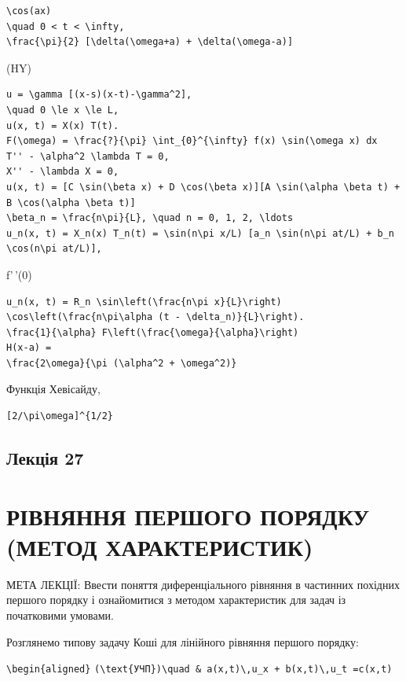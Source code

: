 \documentclass[
  ukrainian,
]{article}
\begin{document}
\begin{verbatim}
\cos(ax)
\quad 0 < t < \infty,
\frac{\pi}{2} [\delta(\omega+a) + \delta(\omega-a)]
\end{verbatim}

(HY)

\begin{verbatim}
u = \gamma [(x-s)(x-t)-\gamma^2],
\quad 0 \le x \le L,
u(x, t) = X(x) T(t).
F(\omega) = \frac{?}{\pi} \int_{0}^{\infty} f(x) \sin(\omega x) dx
T'' - \alpha^2 \lambda T = 0,
X'' - \lambda X = 0,
u(x, t) = [C \sin(\beta x) + D \cos(\beta x)][A \sin(\alpha \beta t) + B \cos(\alpha \beta t)]
\beta_n = \frac{n\pi}{L}, \quad n = 0, 1, 2, \ldots
u_n(x, t) = X_n(x) T_n(t) = \sin(n\pi x/L) [a_n \sin(n\pi at/L) + b_n \cos(n\pi at/L)],
\end{verbatim}

f'\,'(0)

\begin{verbatim}
u_n(x, t) = R_n \sin\left(\frac{n\pi x}{L}\right) \cos\left(\frac{n\pi\alpha (t - \delta_n)}{L}\right).
\frac{1}{\alpha} F\left(\frac{\omega}{\alpha}\right)
H(x-a) =
\frac{2\omega}{\pi (\alpha^2 + \omega^2)}
\end{verbatim}

Функція Хевісайду,

\begin{verbatim}
[2/\pi\omega]^{1/2}
\end{verbatim}

\subsection{Лекція 27}\label{ux43bux435ux43aux446ux456ux44f-27}

\section{РІВНЯННЯ ПЕРШОГО ПОРЯДКУ (МЕТОД
ХАРАКТЕРИСТИК)}\label{ux440ux456ux432ux43dux44fux43dux43dux44f-ux43fux435ux440ux448ux43eux433ux43e-ux43fux43eux440ux44fux434ux43aux443-ux43cux435ux442ux43eux434-ux445ux430ux440ux430ux43aux442ux435ux440ux438ux441ux442ux438ux43a}

МЕТА ЛЕКЦІЇ: Ввести поняття диференціального рівняння в частинних
похідних першого порядку і ознайомитися з методом характеристик для
задач із початковими умовами.

Розглянемо типову задачу Коші для лінійного рівняння першого порядку:

\texttt{\textbackslash{}begin\{aligned\}}
\texttt{(\textbackslash{}text\{УЧП\})\textbackslash{}quad\ \&\ \textquotesingle{}a(x,t)\textquotesingle{}\textbackslash{},\textquotesingle{}u\_x\textquotesingle{}\ +\ \textquotesingle{}b(x,t)\textquotesingle{}\textbackslash{},\textquotesingle{}u\_t\ =\textquotesingle{}c(x,t)}
\end{document}
